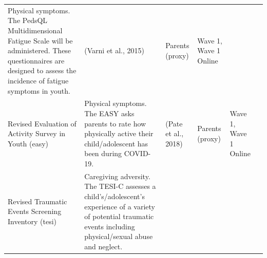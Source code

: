 \documentclass[]{book}
\begin{document}
\begin{longtable}[]{@{}llllll@{}}
\begin{minipage}[t]{0.18\columnwidth}
Physical symptoms. The PedsQL Multidimensional Fatigue Scale will be administered. These questionnaires are designed to assess the incidence of fatigue symptoms in youth.\strut
\end{minipage} & \begin{minipage}[t]{0.15\columnwidth}\raggedright
(Varni et al., 2015)\strut
\end{minipage} & \begin{minipage}[t]{0.16\columnwidth}\raggedright
Parents (proxy)\strut
\end{minipage} & \begin{minipage}[t]{0.06\columnwidth}\raggedright
Wave 1, Wave 1 Online\strut
\end{minipage} & \begin{minipage}[t]{0.10\columnwidth}\raggedright
\strut
\end{minipage}\tabularnewline
\begin{minipage}[t]{0.18\columnwidth}\raggedright
Revised Evaluation of Activity Survey in Youth (easy)\strut
\end{minipage} & \begin{minipage}[t]{0.18\columnwidth}\raggedright
Physical symptoms. The EASY asks parents to rate how physically active their child/adolescent has been during COVID-19.\strut
\end{minipage} & \begin{minipage}[t]{0.15\columnwidth}\raggedright
(Pate et al., 2018)\strut
\end{minipage} & \begin{minipage}[t]{0.16\columnwidth}\raggedright
Parents (proxy)\strut
\end{minipage} & \begin{minipage}[t]{0.06\columnwidth}\raggedright
Wave 1, Wave 1 Online\strut
\end{minipage} & \begin{minipage}[t]{0.10\columnwidth}\raggedright
\strut
\end{minipage}\tabularnewline
\begin{minipage}[t]{0.18\columnwidth}\raggedright
Revised Traumatic Events Screening Inventory (tesi)\strut
\end{minipage} & \begin{minipage}[t]{0.18\columnwidth}\raggedright
Caregiving adversity. The TESI-C assesses a child's/adolescent's experience of a variety of potential traumatic events including physical/sexual abuse and neglect.\strut
\end{minipage} & \begin{minipage}[t]{0.15\columnwidth}\raggedright

\end{minipage}
\end{longtable}
\end{document}
